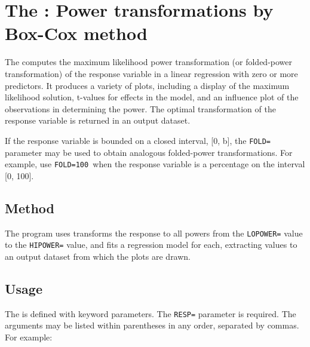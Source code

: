 
\section{The : Power transformations by Box-Cox method}\label{mac:boxcox}

The  computes the maximum likelihood power transformation
(or folded-power transformation) of the response variable in a linear
regression with zero or more predictors.  It produces a variety of plots,
including a display of the maximum likelihood solution, t-values for
effects in the model, and an influence plot of the observations in
determining the power.  The optimal transformation of the response
variable is returned in an output dataset.

If the response variable is bounded on a closed interval, [0, b],
the \texttt{FOLD=} parameter may be used to obtain analogous folded-power
transformations.  For example, use \texttt{FOLD=100 }when the response
variable is a percentage on the interval [0, 100].

\subsection*{Method}

The program uses transforms the response to all powers from
the \texttt{LOPOWER=} value to the \texttt{HIPOWER=} value, and fits a regression
model for each, extracting values to an output dataset from
which the plots are drawn.

\subsection*{Usage}

The  is defined with keyword parameters.  The \texttt{RESP=}
parameter is required.
The arguments may be listed within parentheses in any order, separated
by commas. For example:

\begin{listing}
\end{listing}
